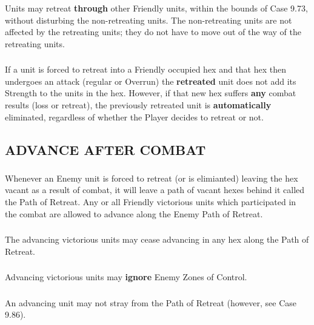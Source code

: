 \subsubsection{} Units may retreat \textbf{through} other Friendly units, within the bounds of Case 9.73, without disturbing the non-retreating units. The non-retreating units are not affected by the retreating units; they do not have to move out of the way of the retreating units.

\subsubsection{} If a unit is forced to retreat into a Friendly occupied hex and that hex then undergoes an attack (regular or Overrun) the \textbf{retreated} unit does not add its Strength to the units in the hex. However, if that new hex suffers \textbf{any} combat results (loss or retreat), the previously retreated unit is \textbf{automatically} eliminated, regardless of whether the Player decides to retreat or not.

\subsection{ADVANCE AFTER COMBAT}

\subsubsection{} Whenever an Enemy unit is forced to retreat (or is elimianted) leaving the hex vacant as a result of combat, it will leave a path of vacant hexes behind it called the Path of Retreat. Any or all Friendly victorious units which participated in the combat are allowed to advance along the Enemy Path of Retreat.

\subsubsection{} The advancing victorious units may cease advancing in any hex along the Path of Retreat.

\subsubsection{} Advancing victorious units may \textbf{ignore} Enemy Zones of Control.

\subsubsection{} An advancing unit may not stray from the Path of Retreat (however, see Case 9.86).

